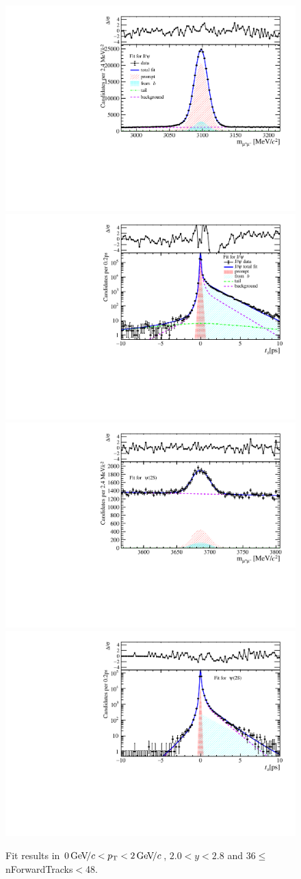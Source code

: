 \begin{figure}[H]
\begin{center}
\includegraphics[width=0.47\linewidth]{pdf/Jpsi/drawmassF/n4y1pt1.pdf}
\includegraphics[width=0.47\linewidth]{pdf/Jpsi/2DFitF/n4y1pt1.pdf}
\vspace*{-0.5cm}
\includegraphics[width=0.47\linewidth]{pdf/Psi2S/drawmassF/n4y1pt1.pdf}
\includegraphics[width=0.47\linewidth]{pdf/Psi2S/2DFitF/n4y1pt1.pdf}
\vspace*{-0.5cm}
\end{center}
\caption{Fit results in $0\text{\,Ge\kern -0.1em V\!/}c<p_{\mathrm{T}}<2\text{\,Ge\kern -0.1em V\!/}c$, $2.0<y<2.8$ and 36$\leq$nForwardTracks$<$48.}
\label{Fitn4y1pt1}
\end{figure}

